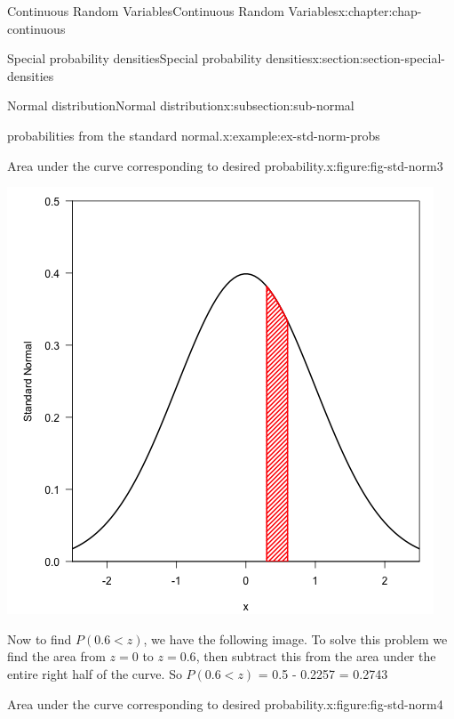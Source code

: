 \documentclass[oneside,10pt,]{book}
\numberwithin{equation}{section}
\newcommand{\lt}{<}
\begin{document}
\begin{chapterptx}{Continuous Random Variables}{}{Continuous Random Variables}{}{}{x:chapter:chap-continuous}
\begin{sectionptx}{Special probability densities}{}{Special probability densities}{}{}{x:section:section-special-densities}
\begin{subsectionptx}{Normal distribution}{}{Normal distribution}{}{}{x:subsection:sub-normal}
\begin{example}{probabilities from the standard normal.}{x:example:ex-std-norm-probs}
\begin{figureptx}{Area under the curve corresponding to desired probability.}{x:figure:fig-std-norm3}{}
\begin{image}{0.25}{0.5}{0.25}
\includegraphics[width=\linewidth]{./images/std_norm3.png}
\end{image}%
\tcblower
\end{figureptx}%
Now to find \(P(0.6 \lt z)\), we have the following image.  To solve this problem we find the area from \(z=0\) to \(z=0.6\), then subtract this from the area under the entire right half of the curve.  So \(P(0.6 \lt z)\) = 0.5 - 0.2257 = 0.2743%
\begin{figureptx}{Area under the curve corresponding to desired probability.}{x:figure:fig-std-norm4}{}%
\begin{image}{0.25}{0.5}{0.25}%

\end{image}
\end{figureptx}
\end{example}
\end{subsectionptx}
\end{sectionptx}
\end{chapterptx}
\end{document}
